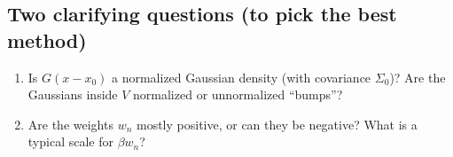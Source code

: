 \documentclass[twocolumn]{notes}
\begin{document}
\subsection{Two clarifying questions (to pick the best method)}
\begin{enumerate}
\item Is $G(x-x_0)$ a normalized Gaussian density (with covariance $\Sigma_0$)? Are the Gaussians inside $V$ normalized or unnormalized ``bumps''?
\item Are the weights $w_n$ mostly positive, or can they be negative? What is a typical scale for $\beta w_n$?
\end{enumerate}
\end{document}
